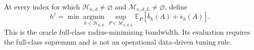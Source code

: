 At every index for which \(\mathcal H_{n,d}\ne\varnothing\) and \(\mathcal M_{n,d,L}\ne\varnothing\), define
\[
 h^\dagger=\min\operatorname*{argmin}_{h\in\mathcal H_{n,d}}
 \sup_{P\in\mathcal M_{n,d,L}}
 \mathbb E_P[\overline b_h(A)+\overline s_h(A)].
\]
This is the oracle full-class radius-minimizing bandwidth.  Its evaluation requires the full-class supremum and is not an operational data-driven tuning rule.